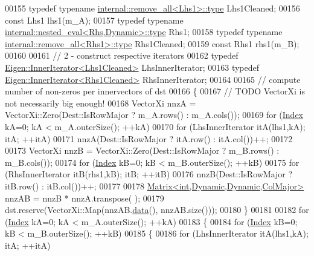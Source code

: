 \begin{DoxyCode}
00155   \textcolor{keyword}{typedef} \textcolor{keyword}{typename} \hyperlink{group___sparse_core___module}{internal::remove\_all<Lhs1>::type} Lhs1Cleaned;
00156   \textcolor{keyword}{const} Lhs1 lhs1(m\_A);
00157   \textcolor{keyword}{typedef} \textcolor{keyword}{typename} \hyperlink{class_eigen_1_1internal_1_1_tensor_lazy_evaluator_writable}{internal::nested\_eval<Rhs,Dynamic>::type} Rhs1;
00158   \textcolor{keyword}{typedef} \textcolor{keyword}{typename} \hyperlink{group___sparse_core___module}{internal::remove\_all<Rhs1>::type} Rhs1Cleaned;
00159   \textcolor{keyword}{const} Rhs1 rhs1(m\_B);
00160     
00161   \textcolor{comment}{// 2 - construct respective iterators}
00162   \textcolor{keyword}{typedef} \hyperlink{class_eigen_1_1_inner_iterator}{Eigen::InnerIterator<Lhs1Cleaned>} LhsInnerIterator;
00163   \textcolor{keyword}{typedef} \hyperlink{class_eigen_1_1_inner_iterator}{Eigen::InnerIterator<Rhs1Cleaned>} RhsInnerIterator;
00164   
00165   \textcolor{comment}{// compute number of non-zeros per innervectors of dst}
00166   \{
00167     \textcolor{comment}{// TODO VectorXi is not necessarily big enough!}
00168     VectorXi nnzA = VectorXi::Zero(Dest::IsRowMajor ? m\_A.rows() : m\_A.cols());
00169     \textcolor{keywordflow}{for} (\hyperlink{namespace_eigen_a62e77e0933482dafde8fe197d9a2cfde}{Index} kA=0; kA < m\_A.outerSize(); ++kA)
00170       \textcolor{keywordflow}{for} (LhsInnerIterator itA(lhs1,kA); itA; ++itA)
00171         nnzA(Dest::IsRowMajor ? itA.row() : itA.col())++;
00172       
00173     VectorXi nnzB = VectorXi::Zero(Dest::IsRowMajor ? m\_B.rows() : m\_B.cols());
00174     \textcolor{keywordflow}{for} (\hyperlink{namespace_eigen_a62e77e0933482dafde8fe197d9a2cfde}{Index} kB=0; kB < m\_B.outerSize(); ++kB)
00175       \textcolor{keywordflow}{for} (RhsInnerIterator itB(rhs1,kB); itB; ++itB)
00176         nnzB(Dest::IsRowMajor ? itB.row() : itB.col())++;
00177     
00178     \hyperlink{group___core___module_class_eigen_1_1_matrix}{Matrix<int,Dynamic,Dynamic,ColMajor>} nnzAB = nnzB * nnzA.transpose(
      );
00179     dst.reserve(VectorXi::Map(nnzAB.\hyperlink{class_eigen_1_1_plain_object_base_ac25699535374b1854cf8494e44ad31b2}{data}(), nnzAB.size()));
00180   \}
00181 
00182   \textcolor{keywordflow}{for} (\hyperlink{namespace_eigen_a62e77e0933482dafde8fe197d9a2cfde}{Index} kA=0; kA < m\_A.outerSize(); ++kA)
00183   \{
00184     \textcolor{keywordflow}{for} (\hyperlink{namespace_eigen_a62e77e0933482dafde8fe197d9a2cfde}{Index} kB=0; kB < m\_B.outerSize(); ++kB)
00185     \{
00186       \textcolor{keywordflow}{for} (LhsInnerIterator itA(lhs1,kA); itA; ++itA)

\end{DoxyCode}
